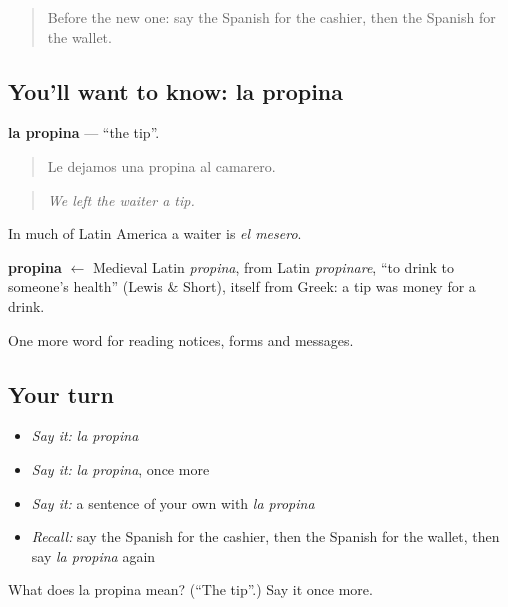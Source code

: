\label{lesson:ES-C491-propina}



\begin{quote}
Before the new one: say the Spanish for the cashier, then the Spanish for the wallet.
\end{quote}

\subsection*{You'll want to know: la propina}
\textbf{la propina} — \textquotedblleft{}the tip\textquotedblright{}.

\begin{quote}
Le dejamos una propina al camarero.
\end{quote}

\begin{quote}
\emph{We left the waiter a tip.}
\end{quote}

In much of Latin America a waiter is \emph{el mesero}.

\begin{cousinweb}
\textbf{propina} $\leftarrow$ Medieval Latin \emph{propina}, from Latin \emph{propinare}, \textquotedblleft{}to drink to someone's health\textquotedblright{} (Lewis \& Short), itself from Greek: a tip was money for a drink.
\end{cousinweb}

\begin{grammarlens}[title={What you've built}]
One more word for reading notices, forms and messages.
\end{grammarlens}

\subsection*{Your turn}
\begin{itemize}
\raggedright
  \item \emph{Say it:} \emph{la propina}
  \item \emph{Say it:} \emph{la propina}, once more
  \item \emph{Say it:} a sentence of your own with \emph{la propina}
  \item \emph{Recall:} say the Spanish for the cashier, then the Spanish for the wallet, then say \emph{la propina} again
\end{itemize}

\begin{tcolorbox}[breakable,colback=teal!4,colframe=teal!35!black,title={Before you move on}]
What does la propina mean? (\textquotedblleft{}The tip\textquotedblright{}.) Say it once more.
\end{tcolorbox}
